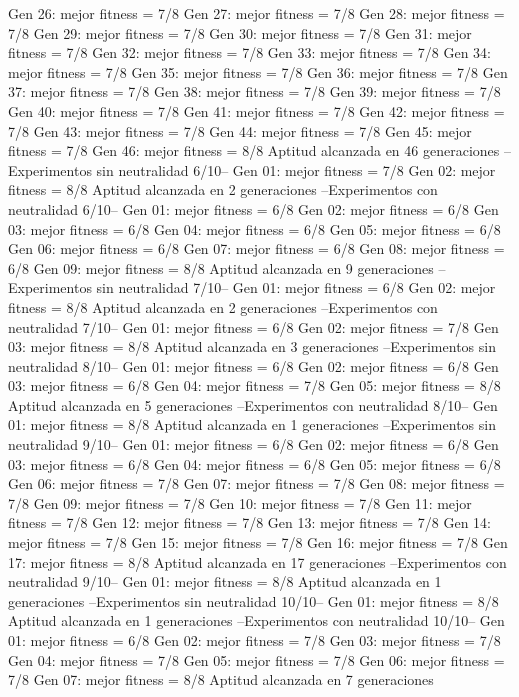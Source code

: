 Gen 26: mejor fitness = 7/8
Gen 27: mejor fitness = 7/8
Gen 28: mejor fitness = 7/8
Gen 29: mejor fitness = 7/8
Gen 30: mejor fitness = 7/8
Gen 31: mejor fitness = 7/8
Gen 32: mejor fitness = 7/8
Gen 33: mejor fitness = 7/8
Gen 34: mejor fitness = 7/8
Gen 35: mejor fitness = 7/8
Gen 36: mejor fitness = 7/8
Gen 37: mejor fitness = 7/8
Gen 38: mejor fitness = 7/8
Gen 39: mejor fitness = 7/8
Gen 40: mejor fitness = 7/8
Gen 41: mejor fitness = 7/8
Gen 42: mejor fitness = 7/8
Gen 43: mejor fitness = 7/8
Gen 44: mejor fitness = 7/8
Gen 45: mejor fitness = 7/8
Gen 46: mejor fitness = 8/8
Aptitud alcanzada en 46 generaciones
--Experimentos sin neutralidad 6/10--
Gen 01: mejor fitness = 7/8
Gen 02: mejor fitness = 8/8
Aptitud alcanzada en 2 generaciones
--Experimentos con neutralidad 6/10--
Gen 01: mejor fitness = 6/8
Gen 02: mejor fitness = 6/8
Gen 03: mejor fitness = 6/8
Gen 04: mejor fitness = 6/8
Gen 05: mejor fitness = 6/8
Gen 06: mejor fitness = 6/8
Gen 07: mejor fitness = 6/8
Gen 08: mejor fitness = 6/8
Gen 09: mejor fitness = 8/8
Aptitud alcanzada en 9 generaciones
--Experimentos sin neutralidad 7/10--
Gen 01: mejor fitness = 6/8
Gen 02: mejor fitness = 8/8
Aptitud alcanzada en 2 generaciones
--Experimentos con neutralidad 7/10--
Gen 01: mejor fitness = 6/8
Gen 02: mejor fitness = 7/8
Gen 03: mejor fitness = 8/8
Aptitud alcanzada en 3 generaciones
--Experimentos sin neutralidad 8/10--
Gen 01: mejor fitness = 6/8
Gen 02: mejor fitness = 6/8
Gen 03: mejor fitness = 6/8
Gen 04: mejor fitness = 7/8
Gen 05: mejor fitness = 8/8
Aptitud alcanzada en 5 generaciones
--Experimentos con neutralidad 8/10--
Gen 01: mejor fitness = 8/8
Aptitud alcanzada en 1 generaciones
--Experimentos sin neutralidad 9/10--
Gen 01: mejor fitness = 6/8
Gen 02: mejor fitness = 6/8
Gen 03: mejor fitness = 6/8
Gen 04: mejor fitness = 6/8
Gen 05: mejor fitness = 6/8
Gen 06: mejor fitness = 7/8
Gen 07: mejor fitness = 7/8
Gen 08: mejor fitness = 7/8
Gen 09: mejor fitness = 7/8
Gen 10: mejor fitness = 7/8
Gen 11: mejor fitness = 7/8
Gen 12: mejor fitness = 7/8
Gen 13: mejor fitness = 7/8
Gen 14: mejor fitness = 7/8
Gen 15: mejor fitness = 7/8
Gen 16: mejor fitness = 7/8
Gen 17: mejor fitness = 8/8
Aptitud alcanzada en 17 generaciones
--Experimentos con neutralidad 9/10--
Gen 01: mejor fitness = 8/8
Aptitud alcanzada en 1 generaciones
--Experimentos sin neutralidad 10/10--
Gen 01: mejor fitness = 8/8
Aptitud alcanzada en 1 generaciones
--Experimentos con neutralidad 10/10--
Gen 01: mejor fitness = 6/8
Gen 02: mejor fitness = 7/8
Gen 03: mejor fitness = 7/8
Gen 04: mejor fitness = 7/8
Gen 05: mejor fitness = 7/8
Gen 06: mejor fitness = 7/8
Gen 07: mejor fitness = 8/8
Aptitud alcanzada en 7 generaciones
